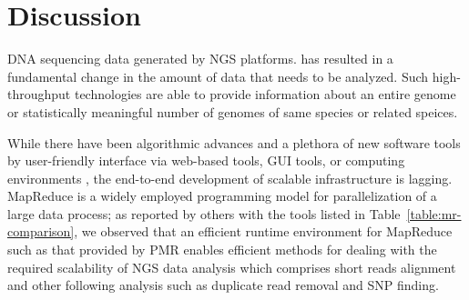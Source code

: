 \documentclass{acm_proc_article-sp}
\begin{document}
\section{Discussion}\label{sec:discussions}


DNA sequencing data generated by NGS
platforms\cite{metzker2010,1000genome,wang2009-natrevgen,alex2009,mcpherson2009}.
has resulted in a fundamental change in the amount of data that needs
to be analyzed. Such high-throughput technologies are able to provide
information about an entire genome or statistically meaningful number
of genomes of same species or related speices.


While there have been algorithmic advances and a plethora of new
software tools by user-friendly interface via web-based tools, GUI
tools, or computing environments \cite{galaxy}, the end-to-end
development of scalable infrastructure is lagging.  MapReduce is a
widely employed programming model for parallelization of a large data
process; as reported by others with the tools listed in
Table~\ref{table:mr-comparison}, we observed that an efficient 
runtime environment for MapReduce such as that provided by PMR 
enables efficient methods for dealing with the required
scalability of NGS data analysis which comprises short reads alignment
and other following analysis such as duplicate read removal and SNP
finding.

\end{document}
